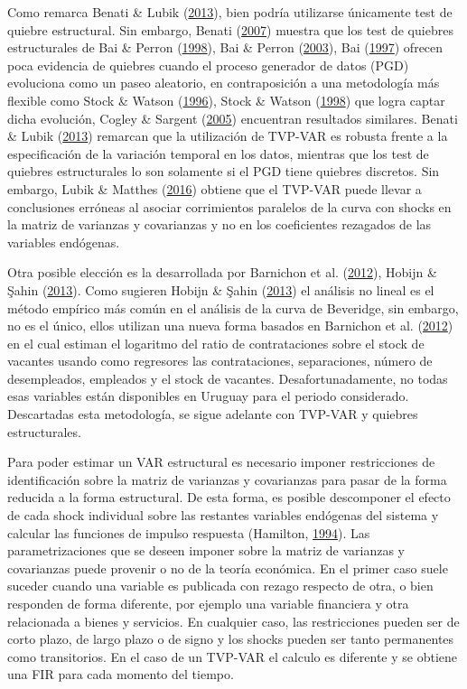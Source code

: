 \documentclass[12pt,oneside]{reedthesis}
\begin{document}
Como remarca Benati \& Lubik (\protect\hyperlink{ref-Benati2013}{2013}), bien podría utilizarse únicamente test de quiebre estructural. Sin embargo, Benati (\protect\hyperlink{ref-Benati2007}{2007}) muestra que los test de quiebres estructurales de Bai \& Perron (\protect\hyperlink{ref-BaiPerron1998}{1998}), Bai \& Perron (\protect\hyperlink{ref-BaiPerron2003}{2003}), Bai (\protect\hyperlink{ref-Bai1997}{1997}) ofrecen poca evidencia de quiebres cuando el proceso generador de datos (PGD) evoluciona como un paseo aleatorio, en contraposición a una metodología más flexible como Stock \& Watson (\protect\hyperlink{ref-Stock1996}{1996}), Stock \& Watson (\protect\hyperlink{ref-Stock1998}{1998}) que logra captar dicha evolución, Cogley \& Sargent (\protect\hyperlink{ref-Cogley2005}{2005}) encuentran resultados similares. Benati \& Lubik (\protect\hyperlink{ref-Benati2013}{2013}) remarcan que la utilización de TVP-VAR es robusta frente a la especificación de la variación temporal en los datos, mientras que los test de quiebres estructurales lo son solamente si el PGD tiene quiebres discretos. Sin embargo, Lubik \& Matthes (\protect\hyperlink{ref-Lubik2016}{2016}) obtiene que el TVP-VAR puede llevar a conclusiones erróneas al asociar corrimientos paralelos de la curva con shocks en la matriz de varianzas y covarianzas y no en los coeficientes rezagados de las variables endógenas.

Otra posible elección es la desarrollada por Barnichon et al. (\protect\hyperlink{ref-Barnichon2012}{2012}), Hobijn \& Şahin (\protect\hyperlink{ref-Hobijn2013}{2013}). Como sugieren Hobijn \& Şahin (\protect\hyperlink{ref-Hobijn2013}{2013}) el análisis no lineal es el método empírico más común en el análisis de la curva de Beveridge, sin embargo, no es el único, ellos utilizan una nueva forma basados en Barnichon et al. (\protect\hyperlink{ref-Barnichon2012}{2012}) en el cual estiman el logaritmo del ratio de contrataciones sobre el stock de vacantes usando como regresores las contrataciones, separaciones, número de desempleados, empleados y el stock de vacantes. Desafortunadamente, no todas esas variables están disponibles en Uruguay para el periodo considerado. Descartadas esta metodología, se sigue adelante con TVP-VAR y quiebres estructurales.

Para poder estimar un VAR estructural es necesario imponer restricciones de identificación sobre la matriz de varianzas y covarianzas para pasar de la forma reducida a la forma estructural. De esta forma, es posible descomponer el efecto de cada shock individual sobre las restantes variables endógenas del sistema y calcular las funciones de impulso respuesta (Hamilton, \protect\hyperlink{ref-Hamilton1994}{1994}). Las parametrizaciones que se deseen imponer sobre la matriz de varianzas y covarianzas puede provenir o no de la teoría económica. En el primer caso suele suceder cuando una variable es publicada con rezago respecto de otra, o bien responden de forma diferente, por ejemplo una variable financiera y otra relacionada a bienes y servicios. En cualquier caso, las restricciones pueden ser de corto plazo, de largo plazo o de signo y los shocks pueden ser tanto permanentes como transitorios. En el caso de un TVP-VAR el calculo es diferente y se obtiene una FIR para cada momento del tiempo.
\end{document}
